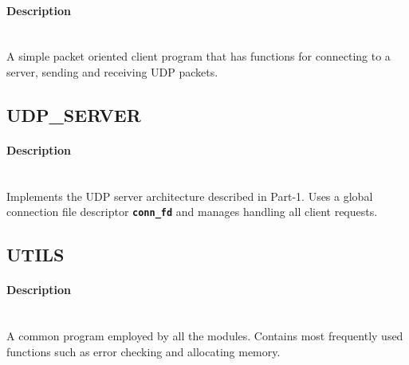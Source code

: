 \documentclass[hidelinks]{report}
\newcommand{\cf}[1] {
	\textbf{\texttt{#1}}
}
\begin{document}
\paragraph*{Description}

~\\ A simple packet oriented client program that has functions for connecting to a server, sending and receiving UDP packets. 

\subsection*{UDP\_SERVER}

\paragraph*{Description}

~\\ Implements the UDP server architecture described in Part-1. Uses a global connection file descriptor \cf{conn\_fd} and manages handling all client requests.

\subsection*{UTILS}

\paragraph*{Description}

~\\ A common program employed by all the modules. Contains most frequently used functions such as error checking and allocating memory.
\end{document}
